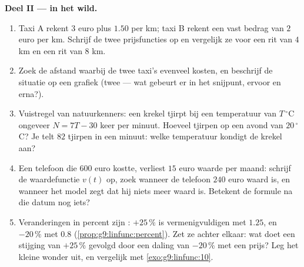\begin{problem}
\medskip
\noindent\textbf{Deel II ---  in het wild.}
\begin{enumerate}[resume]
  \item Taxi A rekent $3$ euro plus $1.50$ per km; taxi B rekent een vast bedrag
        van $2$ euro per km. Schrijf de twee prijsfuncties op en vergelijk ze voor
        een rit van $4$ km en een rit van $8$ km.
  \item Zoek de afstand waarbij de twee taxi's evenveel kosten, en beschrijf de
        situatie op een grafiek (twee  --- wat gebeurt er in het snijpunt,
        ervoor en erna?).
  \item Vuistregel van natuurkenners: een krekel tjirpt bij een temperatuur van
        $T\,^\circ$C ongeveer $N = 7T - 30$ keer per minuut. Hoeveel tjirpen op een
        avond van $20\,^\circ$C? Je telt $82$ tjirpen in een minuut: welke
        temperatuur kondigt de krekel aan?
  \item Een telefoon die $600$ euro kostte, verliest $15$ euro waarde per maand:
        schrijf de waardefunctie $v(t)$ op, zoek wanneer de telefoon $240$ euro
        waard is, en wanneer het model zegt dat hij niets meer waard is. Betekent
        de formule na die datum nog iets?
  \item Veranderingen in percent zijn : $+25\,\%$ is
        vermenigvuldigen met $1.25$, en $-20\,\%$ met $0.8$
        (\cref{prop:g9:linfunc:percent}). Zet ze achter elkaar: wat doet een
        stijging van $+25\,\%$ gevolgd door een daling van $-20\,\%$ met een prijs?
        Leg het kleine wonder uit, en vergelijk met \cref{exo:g9:linfunc:10}.
\end{enumerate}


\end{problem}
